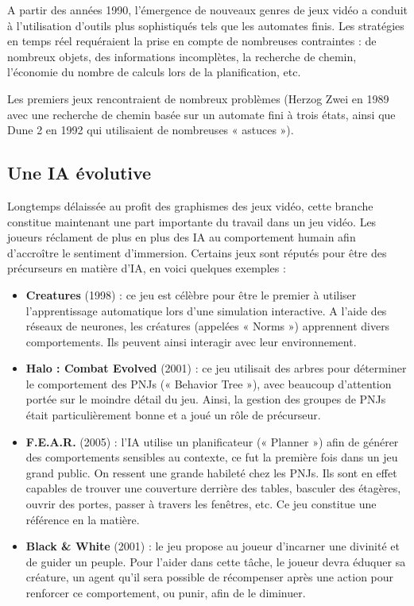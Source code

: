 \documentclass[a4paper, 12pt]{article} %
\begin{document}
A partir des années 1990, l’émergence de nouveaux genres de jeux vidéo a conduit à l’utilisation d’outils plus sophistiqués tels que les automates finis. Les stratégies en temps réel requéraient la prise en compte de nombreuses contraintes : de nombreux objets, des informations incomplètes, la recherche de chemin, l’économie du nombre de calculs lors de la planification, etc. 

Les premiers jeux rencontraient de nombreux problèmes (Herzog Zwei en 1989 avec une recherche de chemin basée sur un automate fini à trois états, ainsi que Dune 2 en 1992 qui utilisaient de nombreuses « astuces »). 

\newpage
\subsection{Une IA évolutive}

Longtemps délaissée au profit des graphismes des jeux vidéo, cette branche constitue maintenant une part importante du travail dans un jeu vidéo. Les joueurs réclament de plus en plus des IA au comportement humain afin d'accroître le sentiment d’immersion. Certains jeux sont réputés pour être des précurseurs en matière d’IA, en voici quelques exemples : 

\begin{itemize}
	\item \textbf{Creatures} (1998) : ce jeu est célèbre pour être le premier à utiliser l’apprentissage automatique lors d’une simulation interactive. A l’aide des réseaux de neurones, les créatures (appelées « Norms ») apprennent divers comportements. Ils peuvent ainsi interagir avec leur environnement. 

	\item \textbf{Halo : Combat Evolved} (2001) : ce jeu utilisait des arbres pour déterminer le comportement des PNJs (« Behavior Tree »), avec beaucoup d’attention portée sur le moindre détail du jeu. Ainsi, la gestion des groupes de PNJs était particulièrement bonne et a joué un rôle de précurseur. 

	\item \textbf{F.E.A.R.} (2005) : l’IA utilise un planificateur (« Planner ») afin de générer des comportements sensibles au contexte, ce fut la première fois dans un jeu grand public. On ressent une grande habileté chez les PNJs. Ils sont en effet capables de trouver une couverture derrière des tables, basculer des étagères, ouvrir des portes, passer à travers les fenêtres, etc. Ce jeu constitue une référence en la matière.  

	\item \textbf{Black \& White} (2001) : le jeu propose au joueur d’incarner une divinité et de guider un peuple. Pour l’aider dans cette tâche, le joueur devra éduquer sa créature, un agent qu’il sera possible de récompenser après une action pour renforcer ce comportement, ou punir, afin de le diminuer. 
\end{itemize}
\end{document}
